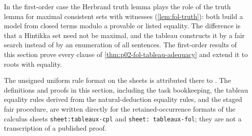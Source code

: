 In the first-order case the Herbrand truth lemma plays the role of the truth
lemma for maximal consistent sets with witnesses
(\cref{lem:fol-truth}): both build a model from closed terms modulo a
provable or listed equality.  The difference is that a Hintikka set need not
be maximal, and the tableau constructs it by a fair search instead of by an
enumeration of all sentences.  The first-order results of this section prove
every clause of \cref{thm:p02-fol-tableau-adequacy} and extend it to roots
with equality.

The unsigned uniform rule format on the sheets is attributed there to
\cite{Smullyan1968}.  The definitions and proofs in this section, including
the task bookkeeping, the tableau equality rules derived from the
natural-deduction equality rules, and the staged fair procedure, are written
directly for the retained-occurrence formats of the calculus sheets
\texttt{sheet:\allowbreak tableaux-cpl} and \texttt{sheet:\allowbreak
tableaux-fol}; they are not a transcription of a published proof.
